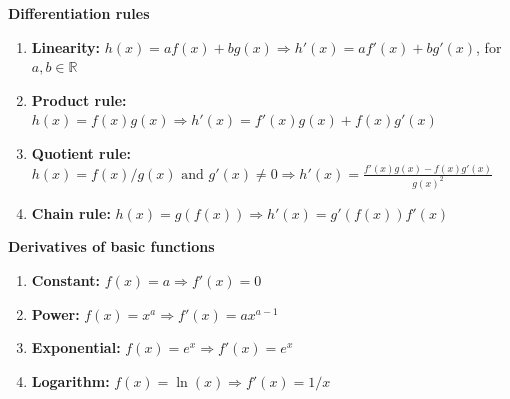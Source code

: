 \documentclass[11pt]{exam}
\newcommand{\R}{\mathbb{R}} %
\begin{document}
\begin{center}
    \textbf{Differentiation rules}
\end{center}
        
        \begin{enumerate}[leftmargin = 0.5cm, label = , rightmargin = 0.2cm]

        \item \textbf{Linearity:} $h(x) = a f(x) + b g(x) \Rightarrow h'(x) = a f'(x) + b g'(x)$, for $a, b \in\R$

        \item \textbf{Product rule:} $h(x) = f(x)g(x) \Rightarrow h'(x) = f'(x)g(x) + f(x)g'(x)$

        \item \textbf{Quotient rule:} $h(x) = f(x)/g(x) \text{ and } g'(x) \neq 0 \Rightarrow h'(x) = \frac{f'(x)g(x) - f(x)g'(x)}{g(x)^2}$

        \item \textbf{Chain rule:} $h(x) = g(f(x)) \Rightarrow h'(x) = g'(f(x))f'(x)$

        \end{enumerate}

\begin{center}
    \textbf{Derivatives of basic functions}
\end{center}

        \begin{enumerate}[leftmargin = 0.5cm, label = , rightmargin = 0.2cm]

        \item \textbf{Constant:} $f(x) = a \Rightarrow f'(x) = 0$
        
        \item \textbf{Power:} $f(x) = x^a \Rightarrow f'(x) = a x^{a-1}$
        
        \item \textbf{Exponential:} $f(x) = e^x \Rightarrow f'(x) = e^x$

        \item \textbf{Logarithm:} $f(x) = \ln(x) \Rightarrow f'(x) = 1/x$
        
        \end{enumerate}
\end{document}
